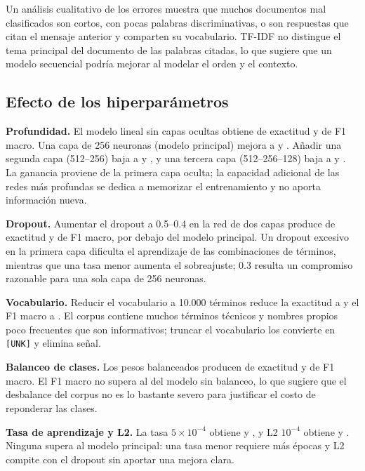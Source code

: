 \documentclass[11pt,letterpaper]{article}
\begin{document}


Un análisis cualitativo de los errores muestra que muchos documentos mal clasificados son cortos, con pocas palabras discriminativas, o son respuestas que citan el mensaje anterior y comparten su vocabulario. TF-IDF no distingue el tema principal del documento de las palabras citadas, lo que sugiere que un modelo secuencial podría mejorar al modelar el orden y el contexto.

\subsection{Efecto de los hiperparámetros}

\textbf{Profundidad.} El modelo lineal sin capas ocultas obtiene \LinearAcc{} de exactitud y \LinearF{} de F1 macro. Una capa de 256 neuronas (modelo principal) mejora a \Accuracy{} y \MacroF{}. Añadir una segunda capa (512--256) baja a \TwoLayerAcc{} y \TwoLayerF{}, y una tercera capa (512--256--128) baja a \DeepAcc{} y \DeepF{}. La ganancia proviene de la primera capa oculta; la capacidad adicional de las redes más profundas se dedica a memorizar el entrenamiento y no aporta información nueva.

\textbf{Dropout.} Aumentar el dropout a 0.5--0.4 en la red de dos capas produce \DropoutAcc{} de exactitud y \DropoutF{} de F1 macro, por debajo del modelo principal. Un dropout excesivo en la primera capa dificulta el aprendizaje de las combinaciones de términos, mientras que una tasa menor aumenta el sobreajuste; 0.3 resulta un compromiso razonable para una sola capa de 256 neuronas.

\textbf{Vocabulario.} Reducir el vocabulario a 10.000 términos reduce la exactitud a \VocabTenAcc{} y el F1 macro a \VocabTenF{}. El corpus contiene muchos términos técnicos y nombres propios poco frecuentes que son informativos; truncar el vocabulario los convierte en \texttt{[UNK]} y elimina señal.

\textbf{Balanceo de clases.} Los pesos balanceados producen \BalancedAcc{} de exactitud y \BalancedF{} de F1 macro. El F1 macro no supera al del modelo sin balanceo, lo que sugiere que el desbalance del corpus no es lo bastante severo para justificar el costo de reponderar las clases.

\textbf{Tasa de aprendizaje y L2.} La tasa $5\times10^{-4}$ obtiene \LrAcc{} y \LrF{}, y L2 $10^{-4}$ obtiene \LtwoAcc{} y \LtwoF{}. Ninguna supera al modelo principal: una tasa menor requiere más épocas y L2 compite con el dropout sin aportar una mejora clara.
\end{document}
